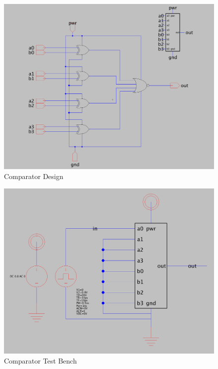 \documentclass[a4paper]{article}
\begin{document}
\begin{figure}[H]
	\centering
	\includegraphics[scale=0.26]{comparator}
	\caption{Comparator Design}
	\label{fig:comparator}
\end{figure}

\begin{figure}[H]
	\centering
	\includegraphics[scale=0.26]{comparatorTest}
	\caption{Comparator Test Bench}
	\label{fig:comparatorTest}
\end{figure}
\end{document}

